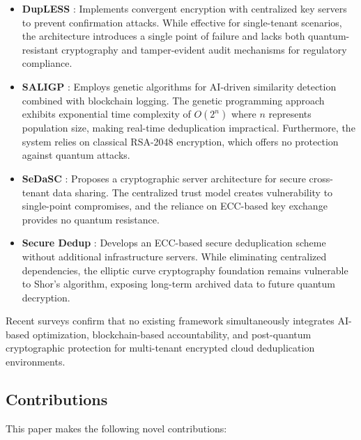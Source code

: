 \documentclass[conference]{IEEEtran}
\begin{document}
\begin{itemize}
\item \textbf{DupLESS} \cite{bellare2013dupless}: Implements convergent encryption with centralized key servers to prevent confirmation attacks. While effective for single-tenant scenarios, the architecture introduces a single point of failure and lacks both quantum-resistant cryptography and tamper-evident audit mechanisms for regulatory compliance.

\item \textbf{SALIGP} \cite{zhang2025saligp}: Employs genetic algorithms for AI-driven similarity detection combined with blockchain logging. The genetic programming approach exhibits exponential time complexity of $O(2^n)$ where $n$ represents population size, making real-time deduplication impractical. Furthermore, the system relies on classical RSA-2048 encryption, which offers no protection against quantum attacks.

\item \textbf{SeDaSC} \cite{rodriguez2024sedasc}: Proposes a cryptographic server architecture for secure cross-tenant data sharing. The centralized trust model creates vulnerability to single-point compromises, and the reliance on ECC-based key exchange provides no quantum resistance.

\item \textbf{Secure Dedup} \cite{liu2015secure}: Develops an ECC-based secure deduplication scheme without additional infrastructure servers. While eliminating centralized dependencies, the elliptic curve cryptography foundation remains vulnerable to Shor's algorithm, exposing long-term archived data to future quantum decryption.
\end{itemize}

Recent surveys \cite{chen2024survey, wang2023postquantum} confirm that no existing framework simultaneously integrates AI-based optimization, blockchain-based accountability, and post-quantum cryptographic protection for multi-tenant encrypted cloud deduplication environments.

\subsection{Contributions}
This paper makes the following novel contributions:
\end{document}
